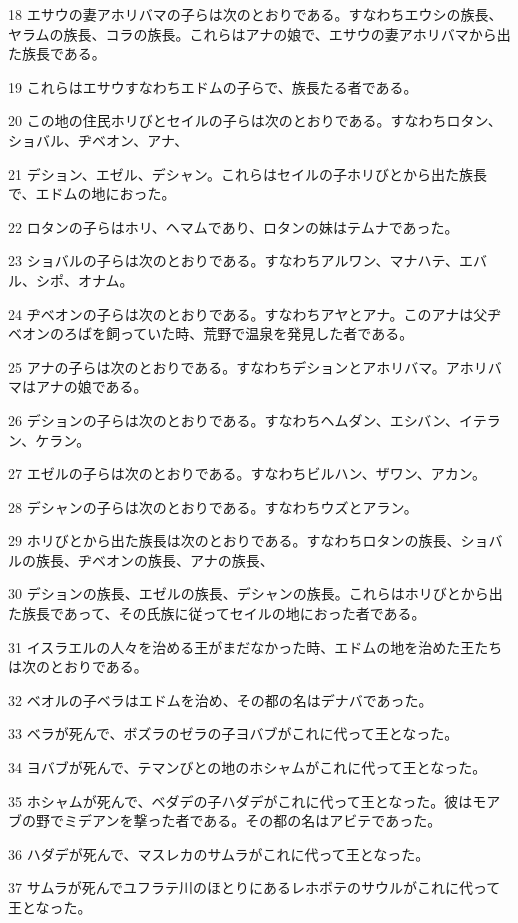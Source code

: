\par 18 エサウの妻アホリバマの子らは次のとおりである。すなわちエウシの族長、ヤラムの族長、コラの族長。これらはアナの娘で、エサウの妻アホリバマから出た族長である。
\par 19 これらはエサウすなわちエドムの子らで、族長たる者である。
\par 20 この地の住民ホリびとセイルの子らは次のとおりである。すなわちロタン、ショバル、ヂベオン、アナ、
\par 21 デション、エゼル、デシャン。これらはセイルの子ホリびとから出た族長で、エドムの地におった。
\par 22 ロタンの子らはホリ、ヘマムであり、ロタンの妹はテムナであった。
\par 23 ショバルの子らは次のとおりである。すなわちアルワン、マナハテ、エバル、シポ、オナム。
\par 24 ヂベオンの子らは次のとおりである。すなわちアヤとアナ。このアナは父ヂベオンのろばを飼っていた時、荒野で温泉を発見した者である。
\par 25 アナの子らは次のとおりである。すなわちデションとアホリバマ。アホリバマはアナの娘である。
\par 26 デションの子らは次のとおりである。すなわちヘムダン、エシバン、イテラン、ケラン。
\par 27 エゼルの子らは次のとおりである。すなわちビルハン、ザワン、アカン。
\par 28 デシャンの子らは次のとおりである。すなわちウズとアラン。
\par 29 ホリびとから出た族長は次のとおりである。すなわちロタンの族長、ショバルの族長、ヂベオンの族長、アナの族長、
\par 30 デションの族長、エゼルの族長、デシャンの族長。これらはホリびとから出た族長であって、その氏族に従ってセイルの地におった者である。
\par 31 イスラエルの人々を治める王がまだなかった時、エドムの地を治めた王たちは次のとおりである。
\par 32 ベオルの子ベラはエドムを治め、その都の名はデナバであった。
\par 33 ベラが死んで、ボズラのゼラの子ヨバブがこれに代って王となった。
\par 34 ヨバブが死んで、テマンびとの地のホシャムがこれに代って王となった。
\par 35 ホシャムが死んで、ベダデの子ハダデがこれに代って王となった。彼はモアブの野でミデアンを撃った者である。その都の名はアビテであった。
\par 36 ハダデが死んで、マスレカのサムラがこれに代って王となった。
\par 37 サムラが死んでユフラテ川のほとりにあるレホボテのサウルがこれに代って王となった。
